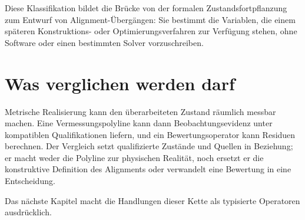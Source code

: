 Diese Klassifikation bildet die Brücke von der formalen Zustandsfortpflanzung
zum Entwurf von Alignment-Übergängen: Sie bestimmt die Variablen, die einem
späteren Konstruktions- oder Optimierungsverfahren zur Verfügung stehen, ohne
Software oder einen bestimmten Solver vorzuschreiben.

\section{Was verglichen werden darf}

Metrische Realisierung kann den überarbeiteten Zustand räumlich messbar machen.
Eine Vermessungspolyline kann dann Beobachtungsevidenz unter kompatiblen
Qualifikationen liefern, und ein Bewertungsoperator kann Residuen berechnen.
Der Vergleich setzt qualifizierte Zustände und Quellen in Beziehung; er macht
weder die Polyline zur physischen Realität, noch ersetzt er die konstruktive
Definition des Alignments oder verwandelt eine Bewertung in eine Entscheidung.

Das nächste Kapitel macht die Handlungen dieser Kette als typisierte
Operatoren ausdrücklich.
